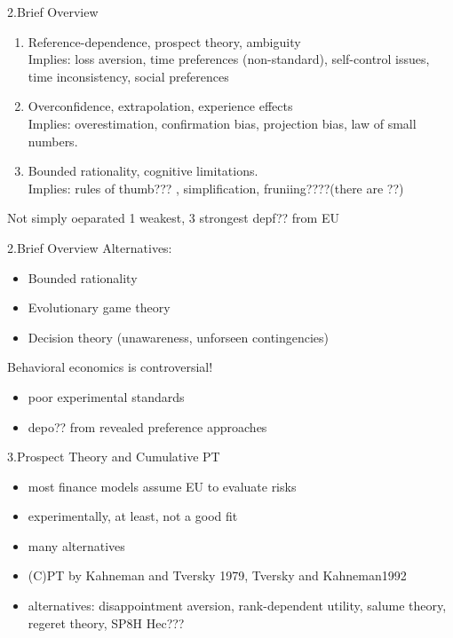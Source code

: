 \documentclass[11pt,aspectratio=169]{beamer}
\begin{document}
\begin{frame}{2.Brief Overview}
    \begin{enumerate}[1:]
        \item Reference-dependence, prospect theory, ambiguity\\
        Implies: loss aversion, time preferences (non-standard), self-control issues, time inconsistency, social preferences\\
        \item Overconfidence, extrapolation, experience effects\\
        Implies: overestimation, confirmation bias, projection bias, law of small numbers.\\
        \item Bounded rationality, cognitive limitations.\\
        Implies: rules of thumb??? , simplification, fruniing????(there are ??)
    \end{enumerate}

    Not simply oeparated 1 weakest, 3 strongest depf??  from EU 
\end{frame}

\begin{frame}{2.Brief Overview}
Alternatives:
    \begin{itemize}
        \item Bounded rationality
        \item Evolutionary game theory
        \item Decision theory (unawareness, unforseen contingencies)
    \end{itemize}
Behavioral economics is controversial!
    \begin{itemize}
        \item poor experimental standards
        \item depo?? from revealed preference approaches
    \end{itemize}    
\end{frame}

\begin{frame}{3.Prospect Theory and Cumulative PT}
    \begin{itemize}
        \item most finance models assume EU to evaluate risks
        \item experimentally, at least, not a good fit
        \item many alternatives 
        \item (C)PT by Kahneman and Tversky 1979, Tversky and Kahneman1992\\
        \item alternatives: disappointment aversion, rank-dependent utility, salume theory, regeret theory, SP8H Hec???
    \end{itemize} 
\end{frame}
\end{document}
